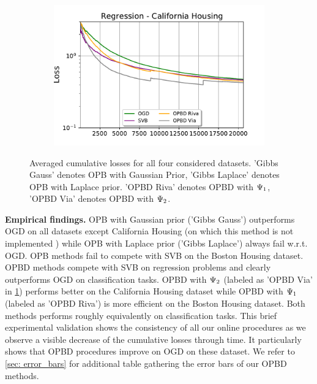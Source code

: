 \begin{figure}
\begin{subfigure}[b]{0.45\textwidth}
\end{subfigure}~
\begin{subfigure}[b]{0.45\textwidth}
  \centering
  \includegraphics[width=\textwidth]{chapter_3/figures/reg_california}
\end{subfigure}
\caption{Averaged cumulative losses for all four considered datasets. 'Gibbs Gauss' denotes OPB with Gaussian Prior, 'Gibbs Laplace' denotes OPB with Laplace prior. 'OPBD Riva' denotes OPBD with $\Psi_{\normalfont1}$, 'OPBD Via' denotes OPBD with $\Psi_{\normalfont2}$. }
\label{fig: exp_results}
 \end{figure}




\textbf{Empirical findings.} OPB with Gaussian prior ('Gibbs Gauss') outperforms OGD on all datasets except California Housing (on which this method is not implemented ) while OPB with Laplace prior ('Gibbs Laplace') always fail w.r.t. OGD. OPB methods fail to compete with SVB on the Boston Housing dataset. OPBD methods compete with SVB on regression problems and clearly outperforms OGD on classification tasks. OPBD with $\Psi_{\normalfont2}$ (labeled as 'OPBD Via' in \cref{fig: exp_results}) performs better on the California Housing dataset while OPBD with $\Psi_{\normalfont1}$ (labeled as 'OPBD Riva') is more efficient on the Boston Housing dataset. Both methods performs roughly equivalently on classification tasks.  This brief experimental validation shows the consistency of all our online procedures as we observe a visible decrease of the cumulative losses through time. It particularly shows that OPBD procedures improve on OGD on these dataset. We refer to \cref{sec: error_bars} for additional table gathering the error bars of our OPBD methods.

